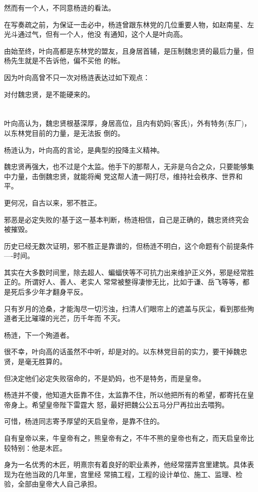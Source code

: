 \documentclass[11pt,a4paper,onecolumn]{article}
\begin{document}
然而有一个人，不同意杨涟的看法。

在写奏疏之前，为保证一击必中，杨涟曾跟东林党的几位重要人物，如赵南星、左光斗通过气，但有一个人，他没
有通知，这个人是叶向高。

由始至终，叶向高都是东林党的盟友，且身居首辅，是压制魏忠贤的最后力量，但杨先生就是不告诉他，偏不买他
的帐。

因为叶向高曾不只一次对杨涟表达过如下观点：

对付魏忠贤，是不能硬来的。

\section[\thesection]{}

叶向高认为，魏忠贤根基深厚，身居高位，且内有奶妈(客氏)，外有特务(东厂)，以东林党目前的力量，是无法扳
倒的。

杨涟认为，叶向高的言论，是典型的投降主义精神。

魏忠贤再强大，也不过是个太监。他手下的那帮人，无非是乌合之众，只要能够集中力量，击倒魏忠贤，就能将阉
党这帮人渣一网打尽，维持社会秩序、世界和平。

更何况，自古以来，邪不胜正。

邪恶是必定失败的!基于这一基本判断，杨涟相信，自己是正确的，魏忠贤终究会被摧毁。

历史已经无数次证明，邪不胜正是靠谱的，但杨涟不明白，这个命题有个前提条件----时间。

其实在大多数时间里，除去超人、蝙蝠侠等不可抗力出来维护正义外，邪是经常胜正的。所谓好人、善人、老实人
常常被整得凄惨无比，比如于谦、岳飞等等，都是死后多少年才翻身平反。

只有岁月的沧桑，才能淘尽一切污浊，扫清人们眼帘上的遮盖与灰尘，看到那些殉道者无比璀璨的光芒，历千年而
不灭。

杨涟，下一个殉道者。

很不幸，叶向高的话虽然不中听，却是对的。以东林党目前的实力，要干掉魏忠贤，是毫无胜算的。

但决定他们必定失败宿命的，不是奶妈，也不是特务，而是皇帝。

杨涟并不傻，他知道大臣靠不住，太监靠不住，所以他把所有的希望，都寄托在皇帝身上。希望皇帝陛下雷霆大
怒，最好把魏公公五马分尸再拉出去喂狗。

可惜，杨涟同志寄予厚望的天启皇帝，是靠不住的。

自有皇帝以来，牛皇帝有之，熊皇帝有之，不牛不熊的皇帝也有之，而天启皇帝比较特别：他是木匠。

身为一名优秀的木匠，明熹宗有着良好的职业素养，他经常摆弄宫里建筑。具体表现为在他当政的几年里，宫里经
常搞工程，工程的设计单位、施工、监理、检验，全部由皇帝大人自己承担。
\end{document}
